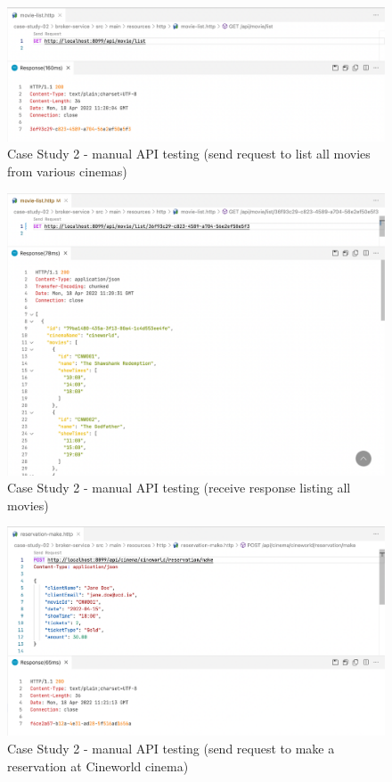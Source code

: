 
\begin{figure}[H]
	\centering
	\includegraphics[width=1.0\linewidth]{./assets/images/case-studies/cs02-manual-1.png}
	\caption{Case Study 2 - manual API testing (send request to list all movies from various cinemas)}
	\label{fig:cs02-manual-1}
\end{figure}

\begin{figure}[H]
	\centering
	\includegraphics[width=1.0\linewidth]{./assets/images/case-studies/cs02-manual-2.png}
	\caption{Case Study 2 - manual API testing (receive response listing all movies)}
    \label{fig:cs02-manual-2}
\end{figure}

\begin{figure}[H]
	\centering
	\includegraphics[width=1.0\linewidth]{./assets/images/case-studies/cs02-manual-3.png}
	\caption{Case Study 2 - manual API testing (send request to make a reservation at Cineworld cinema)}
	\label{fig:cs02-manual-3}
\end{figure}

